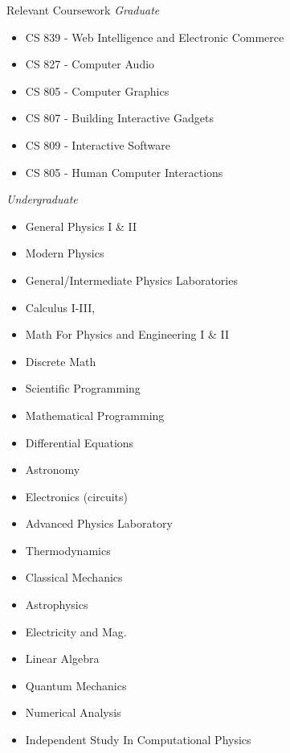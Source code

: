 \documentclass{resume} %
\begin{document}
\begin{rSection}{Relevant Coursework}
\emph{Graduate}
\begin{itemize}
    \item CS 839 - Web Intelligence and Electronic Commerce
    \item CS 827 - Computer Audio
    \item CS 805 - Computer Graphics
    \item CS 807 - Building Interactive Gadgets
    \item CS 809 - Interactive Software
    \item CS 805 - Human Computer Interactions
\end{itemize}

\emph{Undergraduate}
\begin{itemize}
    \item General Physics I \& II
    \item Modern Physics
    \item General/Intermediate Physics Laboratories
    \item Calculus I-III,
    \item Math For Physics and Engineering I \& II
    \item Discrete Math
    \item Scientific Programming
    \item Mathematical Programming
    \item Differential Equations
    \item Astronomy
    \item Electronics (circuits)
    \item Advanced Physics Laboratory
    \item Thermodynamics
    \item Classical Mechanics
    \item Astrophysics
    \item Electricity and Mag.
    \item Linear Algebra
    \item Quantum Mechanics
    \item Numerical Analysis
    \item Independent Study In Computational Physics
\end{itemize}

\end{rSection}
\end{document}
